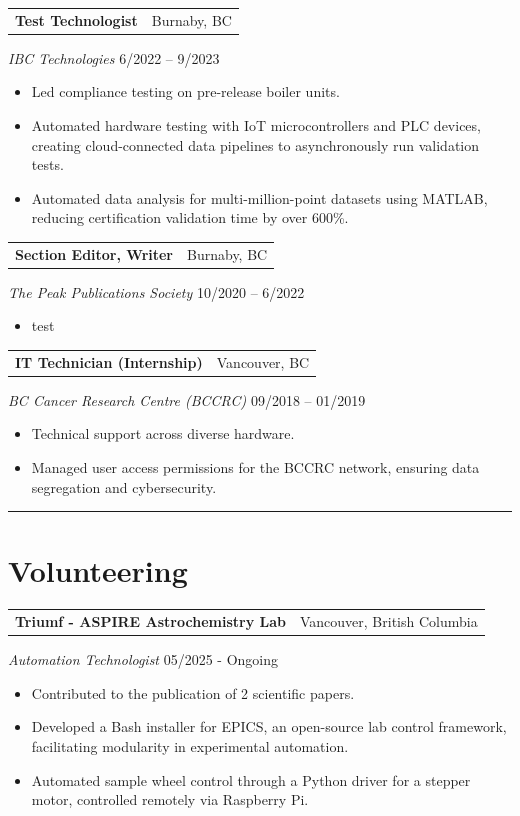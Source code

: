 \documentclass[a4paper,10pt]{article}
\makeatletter
\newcommand{\leadership}[5]{
	{
		\vspace{1.5mm}
		\noindent
		\begin{tabular*}{\textwidth}{@{\extracolsep{\fill}} l r}
			\textbf{#1} & #2 \\
		\end{tabular*}
		
		\noindent\textit{#3} \hfill #4 \\
		\vspace{-5mm}
		\begin{itemize}
			
			\setlength{\itemsep}{-1mm}   %
			\setlength{\topsep}{-4mm}
			\setlength{\parsep}{0mm}
			#5
		\end{itemize}
	}
}
\newcommand{\work}[5]{
	{
		\vspace{1.5mm}
		\noindent
		\begin{tabular*}{\textwidth}{@{\extracolsep{\fill}} l r}
			\textbf{#1} & #2 \\
		\end{tabular*}
		\vspace{-5mm}
		\textit{#3} \hfill #4 \\
		\begin{itemize}
			\setlength{\itemsep}{-1mm}
			\setlength{\topsep}{0mm}
			\setlength{\parsep}{0mm}
			#5
		\end{itemize}
	}
}
\makeatother
\begin{document}
	\work
	{Test Technologist}
	{Burnaby, BC}
	{IBC Technologies}
	{6/2022 – 9/2023}
	{
		\item Led compliance testing on pre-release boiler units.
			
		\item Automated hardware testing with IoT microcontrollers and PLC devices, creating cloud-connected data pipelines to asynchronously run validation tests.
		
		\item Automated data analysis for multi-million-point datasets using MATLAB, reducing certification validation time by over 600\%.
	}
		
	\work
	{Section Editor, Writer}
	{Burnaby, BC}
	{The Peak Publications Society}
	{10/2020 – 6/2022}
		{\item test}

	
	
	\work
	{IT Technician (Internship)}
	{Vancouver, BC}
	{BC Cancer Research Centre (\textnormal{BCCRC})}
	{09/2018 – 01/2019}
	{
		\item Technical support across diverse hardware.
		\item Managed user access permissions for the BCCRC network, ensuring data segregation and cybersecurity.
	}
	
	
	
\noindent\rule{\textwidth}{0.4pt}
\section*{Volunteering}

		\leadership
		{Triumf - ASPIRE Astrochemistry Lab}
		{Vancouver, British Columbia}
		{Automation Technologist}
		{05/2025 - Ongoing}
		{
			\item Contributed to the publication of 2 scientific papers.
			\item Developed a Bash installer for EPICS, an open-source lab control framework, facilitating modularity in experimental automation.
			\item Automated sample wheel control through a Python driver for a stepper motor, controlled remotely via Raspberry Pi.
		}

	
\end{document}

